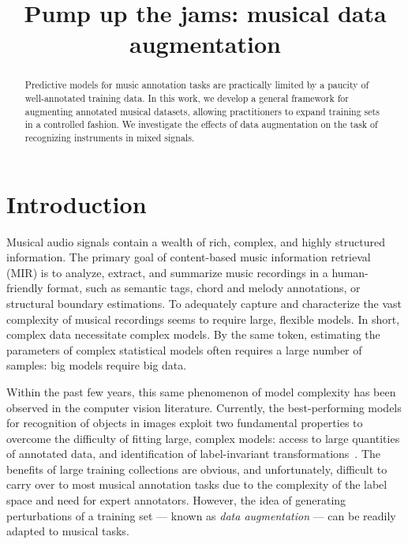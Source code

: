 \documentclass{article}
\title{Pump up the jams: musical data augmentation}
\begin{document}
%
\maketitle
%
\begin{abstract}
Predictive models for music annotation tasks are practically limited by a paucity of
well-annotated training data.
In this work, we develop a general framework for augmenting annotated musical datasets,
allowing practitioners to expand training sets in a controlled fashion.
We investigate the effects of data augmentation on the task of recognizing instruments
in mixed signals.
\end{abstract}
%
\section{Introduction}
\label{sec:introduction}


Musical audio signals contain a wealth of rich, complex, and highly structured
information.  The primary goal of content-based music information retrieval (MIR) is to
analyze, extract, and summarize music recordings in a human-friendly
format, such as semantic tags, chord and melody annotations, or structural boundary
estimations.  To adequately capture and characterize the vast complexity of musical
recordings seems to require large, flexible models.  In short, complex data necessitate
complex models.
By the same token, estimating the parameters of complex statistical models often requires
a large number of samples: big models require big data.

Within the past few years, this same phenomenon of model complexity has been observed 
in the computer vision literature.  Currently, the best-performing models for recognition 
of objects in images exploit two fundamental properties to overcome the difficulty of 
fitting large, complex models: access to large quantities of annotated data, and 
identification of label-invariant transformations~\cite{krizhevsky2012imagenet}.
The benefits of large training collections are obvious, and unfortunately, difficult to 
carry over to most musical annotation tasks due to the complexity of the label space and
need for expert annotators.  However, the idea of generating perturbations of a training
set --- known as \emph{data augmentation} --- can be readily adapted to musical tasks.
\end{document}
